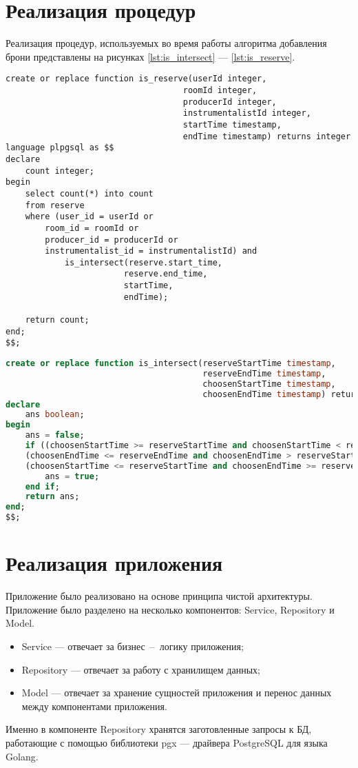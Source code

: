 \section{Реализация процедур}
Реализация процедур, используемых во время работы алгоритма добавления брони представлены на рисунках \ref{lst:is_intersect} --- \ref{lst:is_reserve}.
\newline
\begin{lstlisting}[label=lst:is_reserve]
create or replace function is_reserve(userId integer,
									roomId integer,
									producerId integer,
									instrumentalistId integer,
									startTime timestamp,
									endTime timestamp) returns integer language plpgsql as $$
declare
	count integer;
begin
	select count(*) into count
	from reserve
	where (user_id = userId or
		room_id = roomId or
		producer_id = producerId or
		instrumentalist_id = instrumentalistId) and 
			is_intersect(reserve.start_time,
						reserve.end_time,
						startTime,
						endTime);

	return count;
end;
$$;
\end{lstlisting}
\newpage

\begin{lstlisting}[language=sql, label=lst:is_intersect]
create or replace function is_intersect(reserveStartTime timestamp, 
										reserveEndTime timestamp,
										choosenStartTime timestamp,
										choosenEndTime timestamp) returns boolean language plpgsql as $$
declare
	ans boolean;
begin
	ans = false;
	if ((choosenStartTime >= reserveStartTime and choosenStartTime < reserveEndTime) or
	(choosenEndTime <= reserveEndTime and choosenEndTime > reserveStartTime) or
	(choosenStartTime <= reserveStartTime and choosenEndTime >= reserveEndTime)) then
		ans = true;
	end if;
	return ans;
end;
$$;
\end{lstlisting}

\section{Реализация приложения}

Приложение было реализовано на основе принципа чистой архитектуры.
Приложение было разделено на несколько компонентов: Service, Repository и Model.
\begin{itemize}
	\item Service --- отвечает за бизнес~--~логику приложения;
	\item Repository --- отвечает за работу с хранилищем данных;
	\item Model --- отвечает за хранение сущностей приложения и перенос данных между компонентами приложения.
\end{itemize}
Именно в компоненте Repository хранятся заготовленные запросы к БД, работающие с помощью библиотеки pgx --- драйвера PostgreSQL для языка Golang. 



